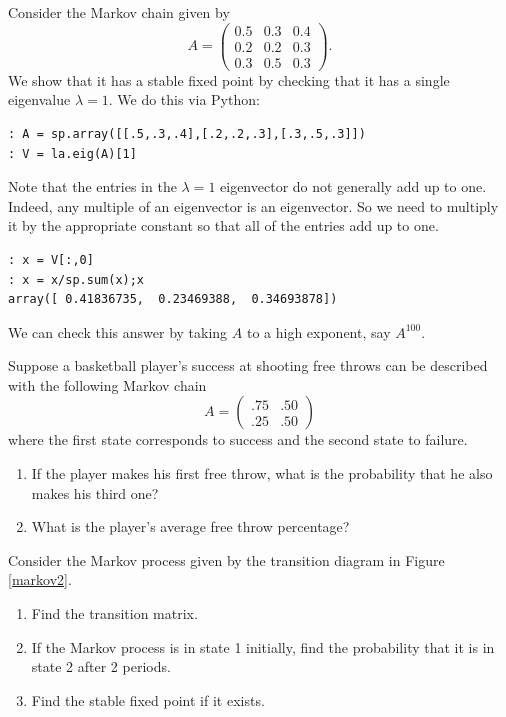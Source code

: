 Consider the Markov chain given by
\[
A = \begin{pmatrix}
0.5 & 0.3 & 0.4\\
0.2 & 0.2 & 0.3\\
0.3 & 0.5 & 0.3
\end{pmatrix}.
\]
We show that it has a stable fixed point by checking that it has a single eigenvalue $\lambda=1$.
We do this via Python:
\begin{lstlisting}[style=python]
: A = sp.array([[.5,.3,.4],[.2,.2,.3],[.3,.5,.3]])
: V = la.eig(A)[1]
\end{lstlisting}
Note that the entries in the $\lambda=1$ eigenvector do not generally add up to one.
Indeed, any multiple of an eigenvector is an eigenvector.
So we need to multiply it by the appropriate constant so that all of the entries add up to one.
\begin{lstlisting}[style=python]
: x = V[:,0]
: x = x/sp.sum(x);x
array([ 0.41836735,  0.23469388,  0.34693878])
\end{lstlisting}
We can check this answer by taking $A$ to a high exponent, say $A^{100}$.

\begin{problem}
Suppose a basketball player's success at shooting free throws can be described with the following Markov chain
\[
A = \begin{pmatrix}.75&.50\\.25&.50\end{pmatrix}
\]
where the first state corresponds to success and the second state to failure.
\begin{enumerate}
\item If the player makes his first free throw, what is the probability that he also makes his third one?
\item What is the player's average free throw percentage?
\end{enumerate}
\end{problem}

\begin{problem}
Consider the Markov process given by the transition diagram in Figure \ref{markov2}.
\begin{enumerate}
\item Find the transition matrix.
\item If the Markov process is in state 1 initially, find the probability that it is in state 2 after 2 periods.
\item Find the stable fixed point if it exists.
\end{enumerate}
\end{problem}

